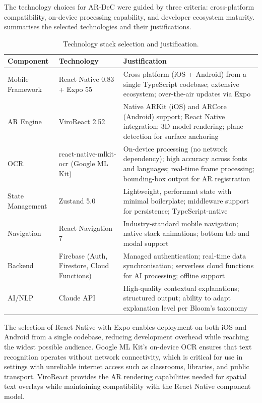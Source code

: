 The technology choices for AR-DeC were guided by three criteria: cross-platform compatibility, on-device processing capability, and developer ecosystem maturity.  summarises the selected technologies and their justifications.

\begin{table}[htbp]
\centering
\caption{Technology stack selection and justification.}
\label{tab:tech_stack}
\small
\begin{tabular}{p{3cm} p{3cm} p{6.5cm}}
\toprule
\textbf{Component} & \textbf{Technology} & \textbf{Justification} \\
\midrule
Mobile Framework & React Native 0.83 + Expo 55 & Cross-platform (iOS + Android) from a single TypeScript codebase; extensive ecosystem; over-the-air updates via Expo \\
\addlinespace
AR Engine & ViroReact 2.52 & Native ARKit (iOS) and ARCore (Android) support; React Native integration; 3D model rendering; plane detection for surface anchoring \\
\addlinespace
OCR & react-native-mlkit-ocr (Google ML Kit) & On-device processing (no network dependency); high accuracy across fonts and languages; real-time frame processing; bounding-box output for AR registration \\
\addlinespace
State Management & Zustand 5.0 & Lightweight, performant state with minimal boilerplate; middleware support for persistence; TypeScript-native \\
\addlinespace
Navigation & React Navigation 7 & Industry-standard mobile navigation; native stack animations; bottom tab and modal support \\
\addlinespace
Backend & Firebase (Auth, Firestore, Cloud Functions) & Managed authentication; real-time data synchronisation; serverless cloud functions for AI processing; offline support \\
\addlinespace
AI/NLP & Claude API & High-quality contextual explanations; structured output; ability to adapt explanation level per Bloom's taxonomy \\
\bottomrule
\end{tabular}
\end{table}

The selection of React Native with Expo enables deployment on both iOS and Android from a single codebase, reducing development overhead while reaching the widest possible audience. Google ML Kit's on-device OCR ensures that text recognition operates without network connectivity, which is critical for use in settings with unreliable internet access such as classrooms, libraries, and public transport. ViroReact provides the AR rendering capabilities needed for spatial text overlays while maintaining compatibility with the React Native component model.
